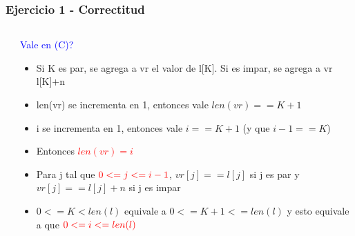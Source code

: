 \begin{frame}[fragile]\frametitle{Ejercicio 1 - Correctitud}
\begin{columns}
\begin{column}{0.35\textwidth}

\end{column}
\begin{column}{0.65\textwidth}


\textcolor{blue}{Vale \I en (C)?}
\begin{itemize}
  \item Si K es par, se agrega a vr el valor de l[K]. Si es impar, se agrega a vr l[K]+n
  \item len(vr) se incrementa en 1, entonces vale $len(vr) == K + 1$
  \item i se incrementa en 1, entonces vale $i == K + 1$ (y que $i-1 == K$)
  \item Entonces \textcolor{red}{$len(vr) = i$} \pause
  \item<3-> Para j tal que $\textcolor{red}{0 <= j <= i-1}$, $vr[j] == l[j]$ si j es par y $vr[j] == l[j]+n$ si j es impar
  \item<4-> $0 <= K < len(l)$ equivale a $0 <= K+1 <= len(l)$ y esto equivale a que $\textcolor{red}{0 <= i <= len(l)}$
\end{itemize}

\end{column}
\end{columns}
\end{frame}



